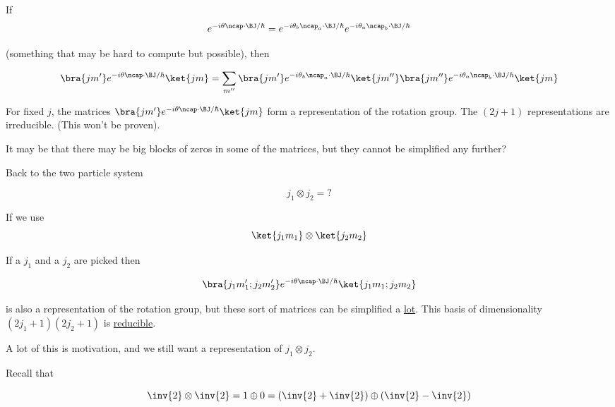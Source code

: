 If
\begin{equation}\label{eqn:qmTwoL17:n}
e^{-i \theta \ncap \cdot \BJ/\hbar}
=
e^{-i \theta_b \ncap_a \cdot \BJ/\hbar}
e^{-i \theta_a \ncap_b \cdot \BJ/\hbar}
\end{equation}

(something that may be hard to compute but possible), then

\begin{equation}\label{eqn:qmTwoL17:n}
\bra{j m'} e^{-i \theta \ncap \cdot \BJ/\hbar} \ket{j m}
=
\sum_{m''}
\bra{j m'} 
e^{-i \theta_b \ncap_a \cdot \BJ/\hbar}
\ket{j m''} \bra{j m''}
e^{-i \theta_a \ncap_b \cdot \BJ/\hbar}
 \ket{j m}
\end{equation}

For fixed $j$, the matrices $\bra{j m'} e^{-i \theta \ncap \cdot \BJ/\hbar} \ket{j m}$ form a representation of the rotation group.  The $(2 j + 1)$ representations are irreducible.  (This won't be proven).

It may be that there may be big blocks of zeros in some of the matrices, but they cannot be simplified any further?

Back to the two particle system

\begin{equation}\label{eqn:qmTwoL17:n}
j_1 \otimes j_2 = ?
\end{equation}

If we use
\begin{equation}\label{eqn:qmTwoL17:n}
\ket{j_1 m_1} \otimes \ket{j_2 m_2}
\end{equation}

If a $j_1$ and a $j_2$ are picked then

\begin{equation}\label{eqn:qmTwoL17:n}
\bra{j_1 m_1' ; j_2 m_2'} e^{-i \theta \ncap \cdot \BJ/\hbar} \ket{j_1 m_1 ; j_2 m_2}
\end{equation}

is also a representation of the rotation group, but these sort of matrices can be simplified a \underline{lot}.  This basis of dimensionality $(2 j_1 + 1)(2 j_2 + 1)$ is \underline{reducible}.

A lot of this is motivation, and we still want a representation of $j_1 \otimes j_2$.

Recall that 

\begin{equation}\label{eqn:qmTwoL17:n}
\inv{2} \otimes \inv{2} = 1 \oplus 0
= 
\left(\inv{2} + \inv{2} \right)
 \oplus 
\left(\inv{2} - \inv{2} \right)
\end{equation}

